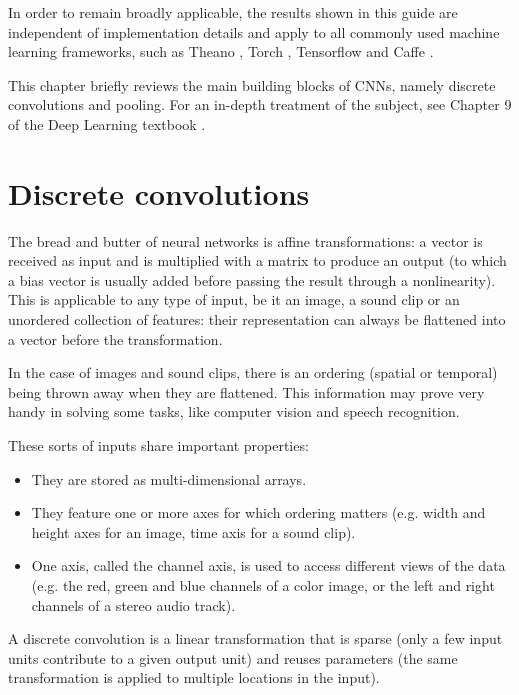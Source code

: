 \documentclass{report}
\begin{document}
In order to remain broadly applicable, the results shown in this guide are
independent of implementation details and apply to all commonly used machine
learning frameworks, such as Theano
\citep{bergstra2010theano,bastien2012theano}, Torch \citep{collobert2011torch7},
Tensorflow \citep{abaditensorflow} and Caffe \citep{jia2014caffe}.

This chapter briefly reviews the main building blocks of CNNs, namely discrete
convolutions and pooling. For an in-depth treatment of the subject, see Chapter
9 of the Deep Learning textbook \citep{Goodfellow-et-al-2016-Book}.

\section{Discrete convolutions}

The bread and butter of neural networks is affine transformations: a vector is
received as input and is multiplied with a matrix to produce an output (to which
a bias vector is usually added before passing the result through a
nonlinearity). This is applicable to any type of input, be it an image, a sound
clip or an unordered collection of features: their representation can always be
flattened into a vector before the transformation.

In the case of images and sound clips, there is an ordering (spatial or
temporal) being thrown away when they are flattened. This information may prove
very handy in solving some tasks, like computer vision and speech recognition.

These sorts of inputs share important properties:

\begin{itemize}
    \item They are stored as multi-dimensional arrays.
    \item They feature one or more axes for which ordering matters (e.g. width
        and height axes for an image, time axis for a sound clip).
    \item One axis, called the channel axis, is used to access different views
        of the data (e.g. the red, green and blue channels of a color image, or
        the left and right channels of a stereo audio track).
\end{itemize}

A discrete convolution is a linear transformation that is sparse (only a few
input units contribute to a given output unit) and reuses parameters (the same
transformation is applied to multiple locations in the input).
\end{document}
